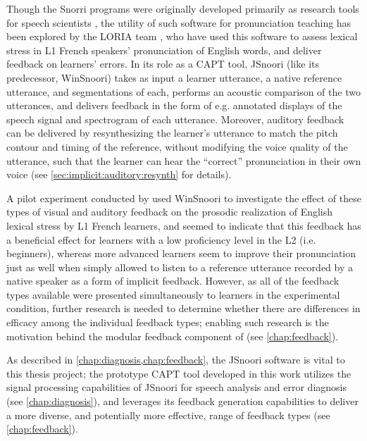 	Though the Snorri programs were originally developed primarily as research tools for speech scientists %
	\citep{Fohr1989,Laprie1999}, 
	the utility of such software
	for pronunciation teaching has been explored by the LORIA team \citep{Bonneau2004,Henry2007,Bonneau2011},
	who have used 
	this software to assess lexical stress in L1 French speakers' pronunciation of English words, and deliver feedback on learners' errors. 
In its role as a CAPT tool, JSnoori (like its predecessor, WinSnoori)
takes as input a learner utterance, a native reference utterance, and segmentations of each, performs an acoustic comparison of the two utterances, and delivers feedback 
in the form of e.g. annotated displays of the speech signal and spectrogram of each utterance. Moreover, auditory feedback can be delivered 
by
resynthesizing the learner's utterance to match the pitch contour and timing of the reference, without modifying the voice quality of the utterance, such that the learner can hear the ``correct'' pronunciation in their own voice (see \cref{sec:implicit:auditory:resynth} for details). 

	A pilot experiment conducted by \textcite{Bonneau2011} used WinSnoori to investigate the effect of these types of visual and auditory feedback on the prosodic realization of English lexical stress by L1 French learners, and seemed to indicate that this feedback has a beneficial effect for learners with a low proficiency level in the L2 (i.e. beginners), whereas more advanced learners seem to improve their pronunciation just as well when simply allowed to listen to a reference utterance recorded by a native speaker as a form of implicit feedback. However, as all of the feedback types available were presented simultaneously to learners in the experimental condition, further research is needed to determine whether there are differences in efficacy among the individual feedback types; enabling such research is the motivation behind the modular feedback component of  (see \cref{chap:feedback}).

	

As described in \cref{chap:diagnosis,chap:feedback}, 
the JSnoori software is vital to this thesis project;
the prototype CAPT tool developed in this work 
utilizes the signal processing capabilities of JSnoori 
for speech analysis and error diagnosis (see \cref{chap:diagnosis}), 
and leverages its feedback generation capabilities to deliver  a more diverse, and potentially more effective, range of feedback types (see \cref{chap:feedback}). 
	

